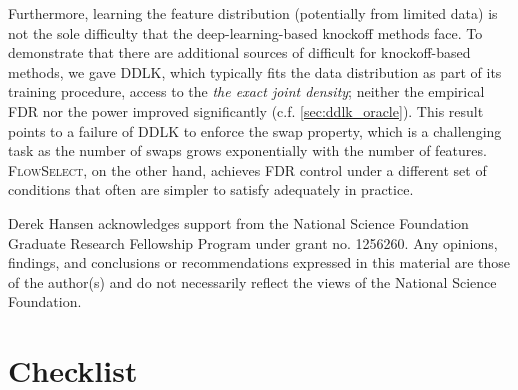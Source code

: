 \documentclass{article}
\newcommand{\FlowSelect}{\textsc{FlowSelect}\xspace}
\begin{document}
Furthermore, learning the feature distribution (potentially from limited data) is not the sole difficulty that the deep-learning-based knockoff methods face.
To demonstrate that there are additional sources of difficult for knockoff-based methods, we gave DDLK, which typically fits the data distribution as part of its training procedure, access to the \textit{the exact joint density}; neither the empirical FDR nor the power improved significantly (c.f. \cref{sec:ddlk_oracle}).
This result points to a failure of DDLK to enforce the swap property, which is a challenging task as the number of swaps grows exponentially with the number of features.
\FlowSelect, on the other hand, achieves FDR control under a different set of conditions that often are simpler to satisfy adequately in practice.

\begin{ack}
Derek Hansen acknowledges support from the National Science Foundation Graduate Research Fellowship Program under grant no. 1256260. 
Any opinions,
findings, and conclusions or recommendations expressed in this material are those of the
author(s) and do not necessarily reflect the views of the National Science Foundation.
\end{ack}




\section*{Checklist}
\end{document}
